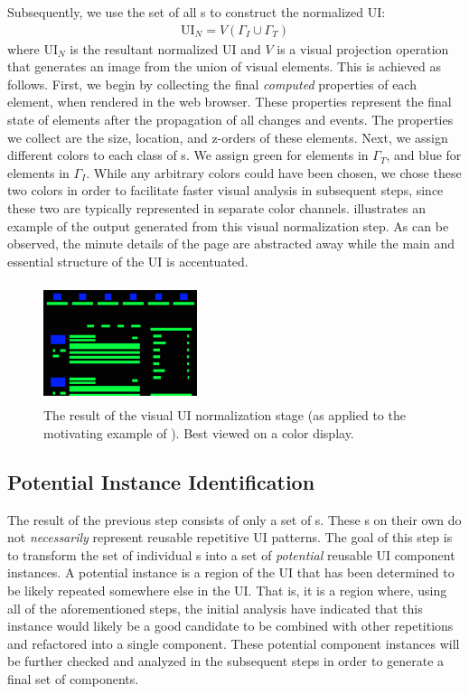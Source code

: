 Subsequently, we use the set of all {\VizElem}s to construct the normalized UI: 
\begin{align}
\mathrm{UI}_N = V\!\left( \Gamma_I \cup \Gamma_T \right)
\end{align}
where $\mathrm{UI}_N$ is the resultant normalized UI and $V$ is a visual projection operation that generates an image from the union of visual elements. This is achieved as follows. First, we begin by collecting the final \emph{computed} properties of each element,
when rendered in the web browser. These properties represent the final state of elements after the propagation of all changes and events. The properties we collect are the size, location, and z-orders of these elements. Next, we assign different colors to each class of {\VizElem}s.
We assign green for elements in $\Gamma_{T}$, and blue for elements in $\Gamma_{I}$.
While any arbitrary colors could have been chosen, we chose these two colors in order to facilitate faster visual analysis in subsequent steps, since these two  are typically represented in separate color channels.
 illustrates an example of the output generated from this visual normalization step.
As can be observed, the minute details of the page are abstracted away while the main and essential structure of the UI is accentuated. 

\begin{figure}
    \centering
    \includegraphics[height=3.5cm,width=0.40\textwidth, clip, trim={0 0cm 0 0cm}]{maintainability/figures/example-normalization}
    \caption{The result of the visual UI normalization stage (as applied to the motivating example of ). Best viewed on a color display.}
    \label{fig:example-normalization}
\end{figure} 

\subsection{Potential Instance Identification}
The result of the previous step consists of only a set of {\VizElem}s.
These {\VizElem}s on their own do not \emph{necessarily} represent reusable repetitive UI patterns. 
The goal of this step is to transform the set of individual {\VizElem}s into a set of \emph{potential} reusable UI component instances.
A potential instance is a region of the UI that has been determined to be likely repeated somewhere else in the UI. That is, it is 
a region where, using all of the aforementioned steps, the 
initial analysis have indicated that this instance would likely be a good candidate to be combined with other repetitions and refactored 
into a single component. These potential component instances will be further checked and analyzed in the subsequent steps in order to generate a final set of components.

